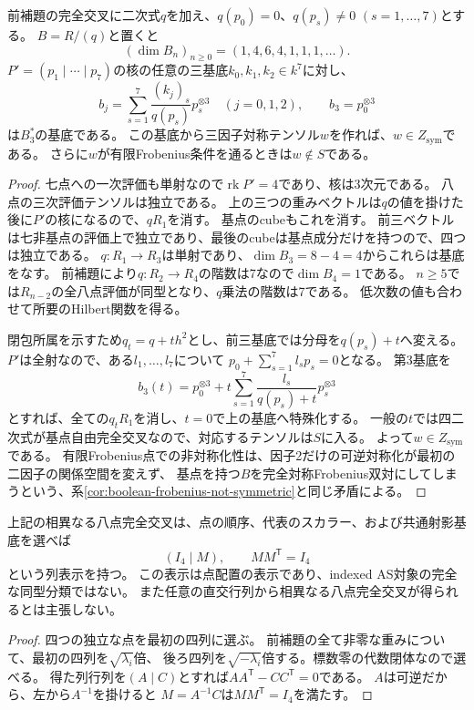 \begin{proposition}[一般の相異なる八点に対する一基点フレーム]
\label{prop:reduced-octad-one-point-frame}
前補題の完全交叉に二次式$q$を加え、$q(p_0)=0$、$q(p_s)\ne0$ $(s=1,\ldots,7)$とする。
$B=R/(q)$と置くと
\[
 (\dim B_n)_{n\geq0}=(1,4,6,4,1,1,1,\ldots).
\]
$P'=(p_1\mid\cdots\mid p_7)$の核の任意の三基底$k_0,k_1,k_2\in k^7$に対し、
\[
 b_j=\sum_{s=1}^7\frac{(k_j)_s}{q(p_s)}p_s^{\otimes3}\quad(j=0,1,2),
 \qquad b_3=p_0^{\otimes3}
\]
は$B_3^*$の基底である。
この基底から三因子対称テンソル$w$を作れば、$w\in Z_{\mathrm{sym}}$である。
さらに$w$が有限Frobenius条件を通るときは$w\notin S$である。
\end{proposition}
\begin{proof}
七点への一次評価も単射なので$\operatorname{rk}P'=4$であり、核は3次元である。
八点の三次評価テンソルは独立である。
上の三つの重みベクトルは$q$の値を掛けた後に$P'$の核になるので、$qR_1$を消す。
基点のcubeもこれを消す。
前三ベクトルは七非基点の評価上で独立であり、最後のcubeは基点成分だけを持つので、四つは独立である。
$q:R_1\to R_3$は単射であり、$\dim B_3=8-4=4$からこれらは基底をなす。
前補題により$q:R_2\to R_4$の階数は7なので$\dim B_4=1$である。
$n\geq5$では$R_{n-2}$の全八点評価が同型となり、$q$乗法の階数は7である。
低次数の値も合わせて所要のHilbert関数を得る。

閉包所属を示すため$q_t=q+t h^2$とし、前三基底では分母を$q(p_s)+t$へ変える。
$P'$は全射なので、ある$l_1,\ldots,l_7$について
$p_0+\sum_{s=1}^7l_sp_s=0$となる。
第3基底を
\[
 b_3(t)=p_0^{\otimes3}
       +t\sum_{s=1}^7\frac{l_s}{q(p_s)+t}p_s^{\otimes3}
\]
とすれば、全ての$q_tR_1$を消し、$t=0$で上の基底へ特殊化する。
一般の$t$では四二次式が基点自由完全交叉なので、対応するテンソルは$S$に入る。
よって$w\in Z_{\mathrm{sym}}$である。
有限Frobenius点での非対称化性は、因子2だけの可逆対称化が最初の二因子の関係空間を変えず、
基点を持つ$B$を完全対称Frobenius双対にしてしまうという、系\ref{cor:boolean-frobenius-not-symmetric}と同じ矛盾による。
\end{proof}

\begin{proposition}[八点の直交行列表示]\label{prop:reduced-octad-orthogonal-form}
上記の相異なる八点完全交叉は、点の順序、代表のスカラー、および共通射影基底を選べば
\[
 (I_4\mid M),\qquad MM^{\mathsf T}=I_4
\]
という列表示を持つ。
この表示は点配置の表示であり、indexed AS対象の完全な同型分類ではない。
また任意の直交行列から相異なる八点完全交叉が得られるとは主張しない。
\end{proposition}
\begin{proof}
四つの独立な点を最初の四列に選ぶ。
前補題の全て非零な重みについて、最初の四列を$\sqrt{\lambda_i}$倍、
後ろ四列を$\sqrt{-\lambda_i}$倍する。標数零の代数閉体なので選べる。
得た列行列を$(A\mid C)$とすれば$AA^{\mathsf T}-CC^{\mathsf T}=0$である。
$A$は可逆だから、左から$A^{-1}$を掛けると
$M=A^{-1}C$は$MM^{\mathsf T}=I_4$を満たす。
\end{proof}

